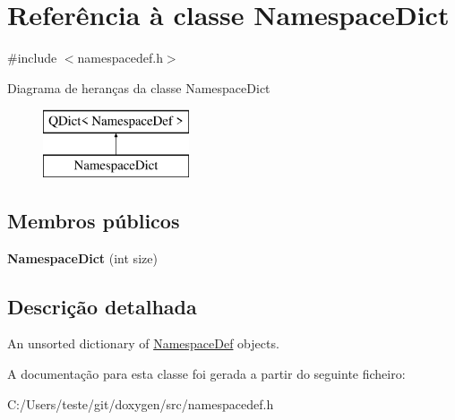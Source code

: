 \hypertarget{class_namespace_dict}{\section{Referência à classe Namespace\-Dict}
\label{class_namespace_dict}
}


{\ttfamily \#include $<$namespacedef.\-h$>$}

Diagrama de heranças da classe Namespace\-Dict\begin{figure}[H]
\begin{center}
\leavevmode
\includegraphics[height=2.000000cm]{class_namespace_dict}
\end{center}
\end{figure}
\subsection*{Membros públicos}
\begin{DoxyCompactItemize}
\item 
\hypertarget{class_namespace_dict_a1592c184060a66763e24c130e651b2c3}{{\bfseries Namespace\-Dict} (int size)}\label{class_namespace_dict_a1592c184060a66763e24c130e651b2c3}

\end{DoxyCompactItemize}


\subsection{Descrição detalhada}
An unsorted dictionary of \hyperlink{class_namespace_def}{Namespace\-Def} objects. 

A documentação para esta classe foi gerada a partir do seguinte ficheiro\-:\begin{DoxyCompactItemize}
\item 
C\-:/\-Users/teste/git/doxygen/src/namespacedef.\-h\end{DoxyCompactItemize}
